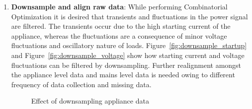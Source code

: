 \documentclass[conference]{IEEEtran}
\newcommand{\figref}[1]{Figure~\ref{#1}}
\begin{document}
\begin{enumerate}
\item \textbf{Downsample and align raw data}: While performing Combinatorial Optimization it is desired that transients and fluctuations in the power signal are filtered. The transients occur due to the high starting current of the appliance, whereas the fluctuations are a consequence of minor voltage fluctuations and oscillatory nature of loads. \figref{fig:downsample_startup} and \figref{fig:downsample_voltage} show how starting current and voltage fluctuations can be filtered by downsampling. 
Further realignment amongst the appliance level data and mains level data is needed owing to different frequency of data collection and missing data.
\begin{figure} 
	
  	\caption{Effect of downsampling appliance data}
    \label{fig:downsampling}
\end{figure}


\end{enumerate}
\end{document}
